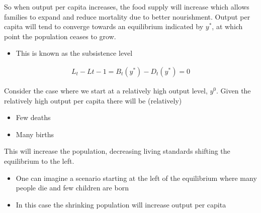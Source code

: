 \documentclass{beamer}
\begin{document}
\begin{frame}
  So when output per capita increases, the food supply will increase which allows families to expand and reduce mortality due to better nourishment. 
  Output per capita will tend to converge towards an equilibrium indicated by $y^*$, at which point the population ceases to grow.
  \begin{itemize}
    \item This is known as the subsistence level
  \end{itemize}
  \begin{align}
  L_t-L{t-1} = B_t(y^*)-D_t(y^*)=0
  \end{align}
\end{frame}

\begin{frame}
  Consider the case where we start at a relatively high output level, $y^0$.
  Given the relatively high output per capita there will be (relatively)
  \begin{itemize}
    \item Few deaths
    \item Many births
  \end{itemize}
  \medskip
  This will increase the population, decreasing living standards shifting the equilibrium to the left. 
  \begin{itemize}
    \item One can imagine a scenario starting at the left of the equilibrium where many people die and few children are born
    \item In this case the shrinking population will increase output per capita
  \end{itemize}
\end{frame}
\end{document}
